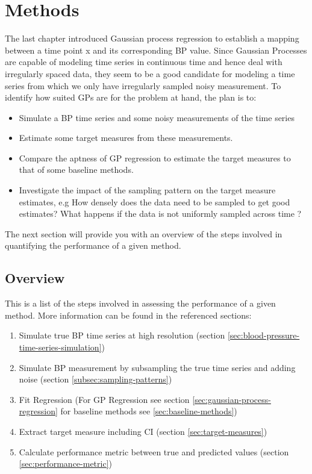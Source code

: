 \usepackage{amsmath}\chapter{Methods}\label{ch:methods}

The last chapter introduced Gaussian process regression
to establish a mapping between a time point x and its
corresponding BP value.
Since Gaussian Processes are capable of modeling time series in continuous
time and hence deal with irregularly spaced data,
they seem to be a good candidate for modeling a time series from which
we only have irregularly sampled noisy measurement.
To identify how suited GPs are for the problem at hand, the plan is to:
\begin{itemize}
    \item Simulate a BP time series and some noisy measurements of the time series
    \item Estimate some target measures from these measurements.
    \item Compare the aptness of GP regression to estimate the target measures to that of some baseline methods.
    \item Investigate the impact of the sampling pattern on the target measure estimates, e.g
    How densely does the data need to be sampled to get good estimates?
    What happens if the data is not uniformly sampled across time ?
\end{itemize}

The next section will provide you with an overview of the steps involved
in quantifying the performance of a given method.


\section{Overview}

This is a list of the steps involved in assessing the performance of a given
method. More information can be found in the referenced sections:

\begin{enumerate}
    \item Simulate true BP time series at high resolution (section \ref{sec:blood-pressure-time-series-simulation})
    \item Simulate BP measurement by subsampling the true time series and adding noise (section \ref{subsec:sampling-patterns})
    \item Fit Regression (For GP Regression see section \ref{sec:gaussian-process-regression}
    for baseline methods see \ref{sec:baseline-methods})
    \item Extract target measure including CI (section \ref{sec:target-measures})
    \item Calculate performance metric between true and predicted values (section \ref{sec:performance-metric})
\end{enumerate}


